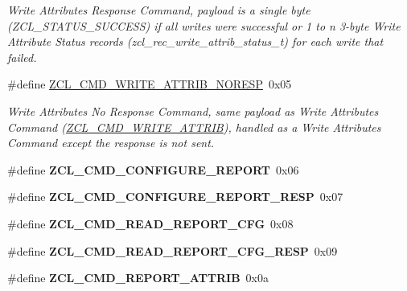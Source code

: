 \begin{DoxyCompactItemize}
\begin{DoxyCompactList}\small\item\em Write Attributes Response Command, payload is a single byte (Z\-C\-L\-\_\-\-S\-T\-A\-T\-U\-S\-\_\-\-S\-U\-C\-C\-E\-S\-S) if all writes were successful or 1 to n 3-\/byte Write Attribute Status records (zcl\-\_\-rec\-\_\-write\-\_\-attrib\-\_\-status\-\_\-t) for each write that failed. \end{DoxyCompactList}\item 
\#define \hyperlink{group__zcl_ga57091c6a11fbc2680ac63fa262bf74ca}{Z\-C\-L\-\_\-\-C\-M\-D\-\_\-\-W\-R\-I\-T\-E\-\_\-\-A\-T\-T\-R\-I\-B\-\_\-\-N\-O\-R\-E\-S\-P}~0x05
\begin{DoxyCompactList}\small\item\em Write Attributes No Response Command, same payload as Write Attributes Command (\hyperlink{group__zcl_ga8843c2bcb861c091ae6f9a4e36f7e4d8}{Z\-C\-L\-\_\-\-C\-M\-D\-\_\-\-W\-R\-I\-T\-E\-\_\-\-A\-T\-T\-R\-I\-B}), handled as a Write Attributes Command except the response is not sent. \end{DoxyCompactList}\item 
\hypertarget{group__zcl_gab0589ada40dc08b6772b72c1fa091370}{\#define {\bfseries Z\-C\-L\-\_\-\-C\-M\-D\-\_\-\-C\-O\-N\-F\-I\-G\-U\-R\-E\-\_\-\-R\-E\-P\-O\-R\-T}~0x06}\label{group__zcl_gab0589ada40dc08b6772b72c1fa091370}

\item 
\hypertarget{group__zcl_ga9def3ca612f14c134aa89e9ae24adc83}{\#define {\bfseries Z\-C\-L\-\_\-\-C\-M\-D\-\_\-\-C\-O\-N\-F\-I\-G\-U\-R\-E\-\_\-\-R\-E\-P\-O\-R\-T\-\_\-\-R\-E\-S\-P}~0x07}\label{group__zcl_ga9def3ca612f14c134aa89e9ae24adc83}

\item 
\hypertarget{group__zcl_gadb61cd667445ad48fc1a6030fe73febb}{\#define {\bfseries Z\-C\-L\-\_\-\-C\-M\-D\-\_\-\-R\-E\-A\-D\-\_\-\-R\-E\-P\-O\-R\-T\-\_\-\-C\-F\-G}~0x08}\label{group__zcl_gadb61cd667445ad48fc1a6030fe73febb}

\item 
\hypertarget{group__zcl_ga73febefe9cdeeef0f741a7f8ab9644b8}{\#define {\bfseries Z\-C\-L\-\_\-\-C\-M\-D\-\_\-\-R\-E\-A\-D\-\_\-\-R\-E\-P\-O\-R\-T\-\_\-\-C\-F\-G\-\_\-\-R\-E\-S\-P}~0x09}\label{group__zcl_ga73febefe9cdeeef0f741a7f8ab9644b8}

\item 
\hypertarget{group__zcl_ga23155269324ae4f2a0b8c4978f2cc738}{\#define {\bfseries Z\-C\-L\-\_\-\-C\-M\-D\-\_\-\-R\-E\-P\-O\-R\-T\-\_\-\-A\-T\-T\-R\-I\-B}~0x0a}\label{group__zcl_ga23155269324ae4f2a0b8c4978f2cc738}


\end{DoxyCompactItemize}
